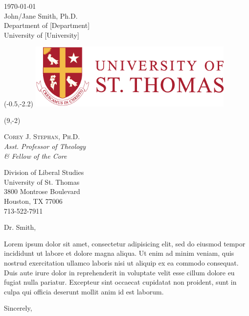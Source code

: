\documentclass[letterpaper,12pt]{letter}
\date{}
\begin{document}
\begin{letter}{
	\today \\\bigskip %
	John/Jane Smith, Ph.D. \\
	Department of [Department] \\
	University of [University]
}
                           
\begin{textblock}{4}(-0.5,-2.2)
\noindent
\hspace*{-0.35cm}\includegraphics[width=4in]{img/ust-logo.eps}
\end{textblock}

{
	\footnotesize %
	\usttext\begin{textblock}{3}(9,-2)
		{
			\color{ustred}
			\noindent
			\textsc{Corey J. Stephan, Ph.D.}\\
			\emph{Asst. Professor of Theology \\ \& Fellow of the Core}
			
			Division of Liberal Studies \\			
			University of St. Thomas \\
			3800 Montrose Boulevard \\
			Houston, TX 77006 \\
			713-522-7911
		}
	\end{textblock}
}

	\opening{Dr. Smith,}

Lorem ipsum dolor sit amet, consectetur adipisicing elit, sed do eiusmod tempor incididunt ut labore et dolore magna aliqua. Ut enim ad minim veniam, quis nostrud exercitation ullamco laboris nisi ut aliquip ex ea commodo consequat. Duis aute irure dolor in reprehenderit in voluptate velit esse cillum dolore eu fugiat nulla pariatur. Excepteur sint occaecat cupidatat non proident, sunt in culpa qui officia deserunt mollit anim id est laborum.


\closing{\vspace{1cm}Sincerely,}
\end{letter}
\end{document}
